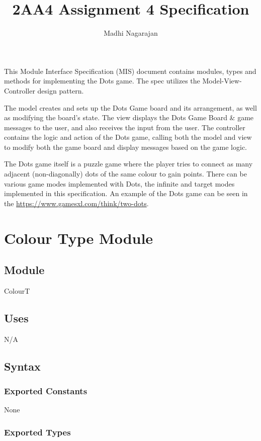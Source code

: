 \documentclass[12pt]{article}
\title{2AA4 Assignment 4 Specification}
\author{Madhi Nagarajan}
\begin{document}
\maketitle
This Module Interface Specification (MIS) document contains modules, types and methods for implementing the Dots game. The spec utilizes the Model-View-Controller design pattern. 

The model creates and sets up the Dots Game board and its arrangement, as well as modifying the board's state. The view displays the Dots Game Board \& game messages to the user, and also receives the input from the user. The controller contains the logic and action of the Dots game, calling both the model and view to modify both the game board and display messages based on the game logic.

The Dots game itself is a puzzle game where the player tries to connect as many adjacent (non-diagonally) dots of the same colour to gain points. There can be various game modes implemented with Dots, the infinite and target modes implemented in this specification. An example of the Dots game can be seen in the \url{https://www.gamesxl.com/think/two-dots}.

\newpage

\section* {Colour Type Module}

\subsection*{Module}

ColourT

\subsection* {Uses}

N/A

\subsection* {Syntax}

\subsubsection* {Exported Constants}

None

\subsubsection* {Exported Types}
\end{document}
